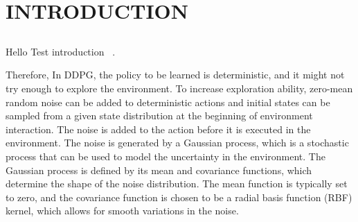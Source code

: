 \section{INTRODUCTION}

\subsection{}

Hello Test introduction~ \cite{Sethian1996}.

Therefore, 
In DDPG, the policy to be learned is deterministic, and it might not try
enough to explore the environment. To increase exploration ability,
zero-mean random noise can be added to deterministic actions and initial
states can be sampled from a given state distribution at the beginning
of environment interaction. The noise is added to the action before it
is executed in the environment. The noise is generated by a Gaussian process,
which is a stochastic process that can be used to model the uncertainty in the environment.
The Gaussian process is defined by its mean and covariance functions,
which determine the shape of the noise distribution. The mean function is typically set to zero,
and the covariance function is chosen to
be a radial basis function (RBF) kernel, which allows for smooth variations in the noise.

